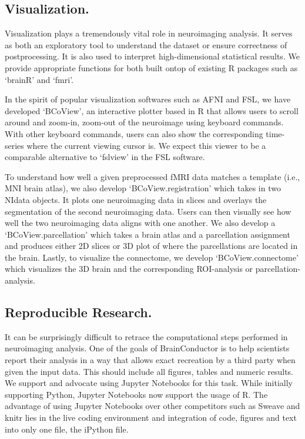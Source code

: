 \documentclass{nature}
\begin{document}
\subsection{Visualization.}
Visualization plays a tremendously vital role in neuroimaging analysis. 
It serves as both an exploratory tool to understand the dataset or ensure correctness
of postprocessing. It is also used to interpret high-dimensional statistical results.
We provide appropriate functions for both built ontop of existing R packages such
as `brainR' and `fmri'. 

In the spirit of popular visualization softwares such as AFNI and FSL, we have
developed `BCoView', an interactive plotter based in R that allows users to scroll around and
zoom-in, zoom-out of the neuroimage using keyboard commands. With other keyboard
commands, users can also show the corresponding time-series where the current viewing
cursor is. We expect this viewer to be a comparable alternative to `fslview' in the FSL
software. 

To understand how well a given preprocessed fMRI data matches a template (i.e., MNI brain
atlas), we also develop `BCoView.registration' which takes in two NIdata objects.
It plots one neuroimaging data in slices and overlays the segmentation of the second
neuroimaging data. Users can then visually see how well the two neuroimaging data aligns
with one another. We also develop a `BCoView.parcellation' which takes a brain atlas and
a parcellation assignment and produces either 2D slices or 3D plot of where the parcellations
are located in the brain.
Lastly, to visualize the connectome, we develop `BCoView.connectome' which visualizes the 
3D brain and the corresponding ROI-analysis or parcellation-analysis. 

\subsection{Reproducible Research.}

It can be surprisingly difficult to retrace the computational steps performed
in neuroimaging analysis. One of the goals of BrainConductor is to help
scientists report their analysis in a way that allows exact recreation by
a third party when given the input data. This should include all figures,
tables and numeric results. We support and advocate using Jupyter Notebooks for
this task. While initially supporting Python, Jupyter Notebooks now support 
the usage of R. The advantage of using Jupyter Notebooks over other competitors 
such as Sweave and knitr lies in the live coding environment and 
integration of code, figures and text into only one file, the iPython file.
\end{document}
